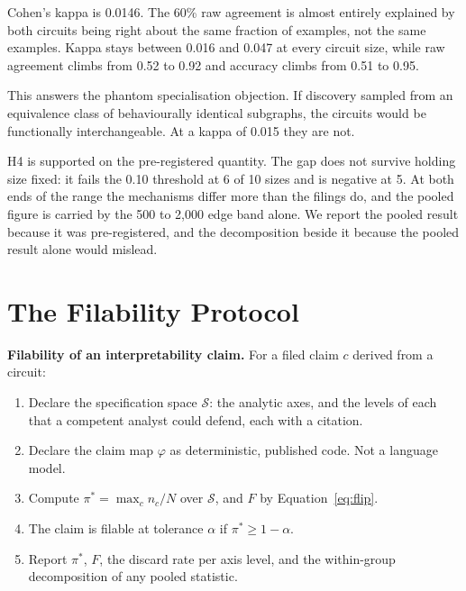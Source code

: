 \documentclass[letterpaper]{article} %
\begin{document}
Cohen's kappa is 0.0146. The 60\% raw agreement is almost entirely explained by
both circuits being right about the same fraction of examples, not the same
examples. Kappa stays between 0.016 and 0.047 at every circuit size, while raw
agreement climbs from 0.52 to 0.92 and accuracy climbs from 0.51 to 0.95.

This answers the phantom specialisation objection. If discovery sampled from an
equivalence class of behaviourally identical subgraphs, the circuits would be
functionally interchangeable. At a kappa of 0.015 they are not.

H4 is supported on the pre-registered quantity. The gap does not survive holding
size fixed: it fails the 0.10 threshold at 6 of 10 sizes and is negative at 5. At
both ends of the range the mechanisms differ more than the filings do, and the
pooled figure is carried by the 500 to 2{,}000 edge band alone. We report the
pooled result because it was pre-registered, and the decomposition beside it
because the pooled result alone would mislead.

\section{The Filability Protocol}

\begin{framed}
\noindent\textbf{Filability of an interpretability claim.} For a filed claim $c$
derived from a circuit:
\begin{enumerate}\itemsep2pt
\item Declare the specification space $\mathcal{S}$: the analytic axes, and the
levels of each that a competent analyst could defend, each with a citation.
\item Declare the claim map $\varphi$ as deterministic, published code. Not a
language model.
\item Compute $\pi^{*} = \max_c n_c / N$ over $\mathcal{S}$, and $F$ by
Equation~\ref{eq:flip}.
\item The claim is filable at tolerance $\alpha$ if $\pi^{*} \geq 1 - \alpha$.
\item Report $\pi^{*}$, $F$, the discard rate per axis level, and the
within-group decomposition of any pooled statistic.
\end{enumerate}
\end{framed}
\end{document}
